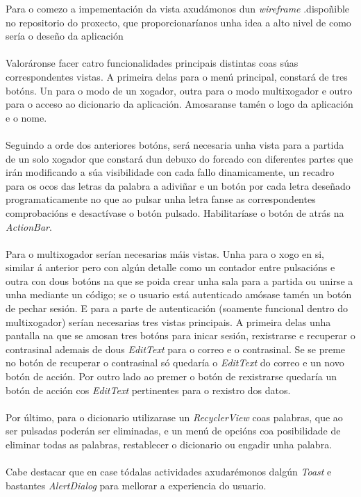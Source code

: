 Para o comezo a impementación da vista axudámonos dun \textit{wireframe} .dispoñible no repositorio do proxecto, que proporcionaríanos unha idea a alto nivel de como sería o deseño da aplicación\\
\\
Valoráronse facer catro funcionalidades principais distintas coas súas correspondentes vistas. A primeira delas para o menú principal, constará de tres botóns. Un para o modo de un xogador, outra para o modo multixogador e outro para o acceso ao dicionario da aplicación. Amosaranse tamén o logo da aplicación e o nome.\\
\\
Seguindo a orde dos anteriores botóns, será necesaria unha vista para a partida de un solo xogador que constará dun debuxo do forcado \cite{hangman} con diferentes partes que irán modificando a súa visibilidade con cada fallo dinamicamente, un recadro para os ocos das letras da palabra a adiviñar e un botón por cada letra deseñado programaticamente no que ao pulsar unha letra fanse as correspondentes comprobacións e desactívase o botón pulsado. Habilitaríase o botón de atrás na \textit{ActionBar}. \\
\\
Para o multixogador serían necesarias máis vistas. Unha para o xogo en si, similar á anterior pero con algún detalle como un contador \cite{loading-spinner} entre pulsacións e outra con dous botóns na que se poida crear unha sala para a partida ou unirse a unha mediante un código; se o usuario está autenticado amósase tamén un botón de pechar sesión. E para a parte de autenticación (soamente funcional dentro do multixogador) serían necesarias tres vistas principais. A primeira delas unha pantalla na que se amosan tres botóns para inicar sesión, rexistrarse e recuperar o contrasinal ademais de dous \textit{EditText} para o correo e o contrasinal. Se se preme no botón de recuperar o contrasinal só quedaría o \textit{EditText} do correo e un novo botón de acción. Por outro lado ao premer o botón de rexistrarse quedaría un botón de acción cos \textit{EditText} pertinentes para o rexistro dos datos. \\
\\
Por último, para o dicionario utilizarase un \textit{RecyclerView} coas palabras, que ao ser pulsadas poderán ser eliminadas, e un menú de opcións coa posibilidade de eliminar todas as palabras, restablecer o dicionario ou engadir unha palabra.\\
\\
Cabe destacar que en case tódalas actividades axudarémonos dalgún \textit{Toast} e bastantes \textit{AlertDialog} para mellorar a experiencia do usuario.


